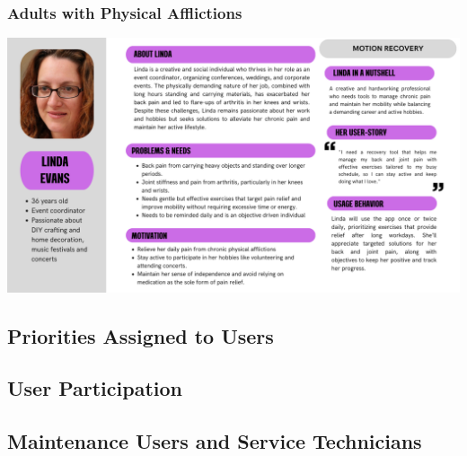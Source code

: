     \subsubsection{Adults with Physical Afflictions}
    \includegraphics[width=\textwidth]{images/personas/patient_adult_physical_affliction.png}
    \vfill

\subsection{Priorities Assigned to Users}
\subsection{User Participation}
\subsection{Maintenance Users and Service Technicians}
